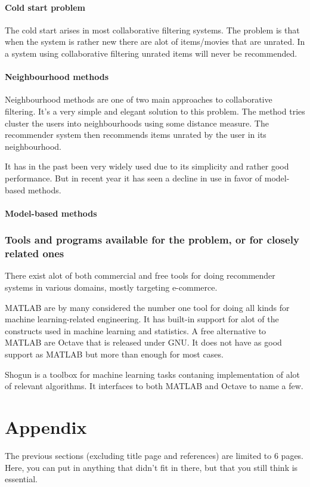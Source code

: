 \documentclass[a4paper,11pt]{article}
\begin{document}
\subsubsection{Cold start problem}
The cold start arises in most collaborative filtering systems. The problem is that when the system is rather new there are alot of items/movies that are unrated. In a system using collaborative filtering unrated items will never be recommended.

\subsubsection{Neighbourhood methods}
Neighbourhood methods are one of two main approaches to collaborative filtering. It's a very simple and elegant solution to this problem. The method tries cluster the users into neighbourhoods using some distance measure. The recommender system then recommends items unrated by the user in its neighbourhood. 

It has in the past been very widely used due to its simplicity and rather good performance. But in recent year it has seen a decline in use in favor of model-based methods.

\subsubsection{Model-based methods}


\subsection{Tools and programs available for the problem, or for closely related ones}
There exist alot of both commercial and free tools for doing recommender systems in various domains, mostly targeting e-commerce. 

MATLAB\cite{matlab-ml} are by many considered
the number one tool for doing all kinds for machine learning-related engineering. It has built-in support for alot of the constructs used in 
machine learning and statistics. A free alternative to MATLAB are Octave\cite{octave} that is released under GNU. It does not have as good support
as MATLAB but more than enough for most cases.

Shogun\cite{shogun} is a toolbox for machine learning tasks contaning implementation of alot of relevant algorithms. It interfaces to both MATLAB
and Octave to name a few.

\chapter{Appendix}
The previous sections (excluding title page and references) are limited to 6 pages. Here, you can put in anything that didn't fit in there, but that you still think is essential.



\end{document}
